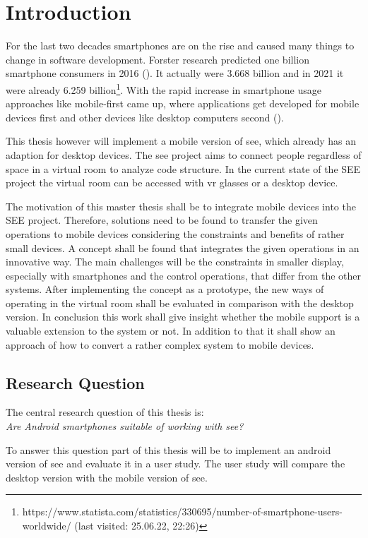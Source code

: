 \section{Introduction}
\label{sec:introduction}
For the last two decades smartphones are on the rise and caused many things to change in software development.
Forster research predicted one billion smartphone consumers in 2016 (\cite{schadler2012mobile}).
It actually were 3.668 billion and in 2021 it were already 6.259 billion\footnote{https://www.statista.com/statistics/330695/number-of-smartphone-users-worldwide/ (last visited: 25.06.22, 22:26)}.
With the rapid increase in smartphone usage approaches like mobile-first came up, where applications get developed for mobile devices first and other devices like desktop computers second (\cite{wroblewski2012mobile}).

This thesis however will implement a mobile version of \gls{see}, which already has an adaption for desktop devices.
The \gls{see} project aims to connect people regardless of space in a virtual room to analyze code structure.  
In the current state of the SEE project the virtual room can be accessed with \gls{vr} glasses or a desktop device.

The motivation of this master thesis shall be to integrate mobile devices into the SEE project. 
Therefore, solutions need to be found to transfer the given operations to mobile devices considering the constraints and benefits of rather small devices.
A concept shall be found that integrates the given operations in an innovative way. 
The main challenges will be the constraints in smaller display, especially with smartphones and the control operations, that differ from the other systems. 
After implementing the concept as a prototype, the new ways of operating in the virtual room shall be evaluated in comparison with the desktop version. 
In conclusion this work shall give insight whether the mobile support is a valuable extension to the system or not. 
In addition to that it shall show an approach of how to convert a rather complex system to mobile devices.

\subsection{Research Question}
\label{research}
The central research question of this thesis is: \\
\textit{Are Android smartphones suitable of working with \gls{see}?}

To answer this question part of this thesis will be to implement an \gls{android} version of \gls{see} and evaluate it in a user study.
The user study will compare the desktop version with the mobile version of \gls{see}.


